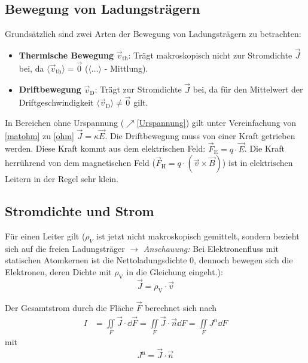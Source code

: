  \subsection{Bewegung von Ladungsträgern}\label{bewlad}
	   Grundsätzlich sind zwei Arten der Bewegung von Ladungsträgern zu betrachten:
	        \begin{itemize}
		        \item \textbf{Thermische Bewegung} \({\vec{v}}_\mathrm{th}\): Trägt makroskopisch nicht zur Stromdichte \(\vec{J}\) bei, da \(\langle \vec{v}_\mathrm{th}\rangle = \vec{0} \) ($\langle\dots\rangle$ - Mittlung).
		        \item \textbf{Driftbewegung} \({\vec{v}}_\mathrm{D}\): Trägt zur Stromdichte \(\vec{J} \) bei, da für den Mittelwert der Driftgeschwindigkeit \(\langle \vec{v}_\mathrm{D}\rangle \ne \vec{0} \) gilt.
	        \end{itemize}
	        In Bereichen ohne Urspannung ($\nearrow$\ref{Urspannung}) gilt unter Vereinfachung von \ref{matohm} zu \ref{ohm} $\vec{J}=\kappa\vec{E}$. Die Driftbewegung muss von einer Kraft getrieben werden. Diese Kraft kommt aus dem elektrischen Feld: \(\vec{F} _\mathrm{E} =  q \cdot \vec{E} \). Die Kraft herrührend von dem magnetischen Feld (\(\vec{F} _\mathrm{H} =  q \cdot \left(\vec{v} \times \vec{B} \right) \)) ist in elektrischen Leitern in der Regel sehr klein.
	   \subsection{Stromdichte und Strom}
  \begin{center}
	  
	  
  \end{center}
  Für einen Leiter gilt ($\rho_V$ ist jetzt nicht makroskopisch gemittelt, sondern bezieht sich auf die freien Ladungsträger $\to$ \textit{Anschauung:} Bei Elektronenfluss mit statischen Atomkernen ist die Nettoladungsdichte 0, dennoch bewegen sich die Elektronen, deren Dichte mit $\rho_\text{V}$ in die Gleichung eingeht.):
  \begin{equation}\label{jrhov}
	  \vec{J} = \rho_\text{V} \cdot \vec{v}
  \end{equation}

  Der Gesamtstrom durch die Fläche \(\vec{F} \) berechnet sich nach
  \begin{equation}\begin{split}
		  I &= \iint\limits_{ F} \vec{J} \cdot \dd{}{\vec{F}}
		  = \iint\limits_{ F} \vec{J} \cdot \vec{n} \dd{}{ F}
		  = \iint\limits_{ F} J^n \dd{}{ F}
	  \end{split}\end{equation}
  mit
  \begin{equation}
	  J^\text{n} = \vec{J} \cdot \vec{n}
  \end{equation}
